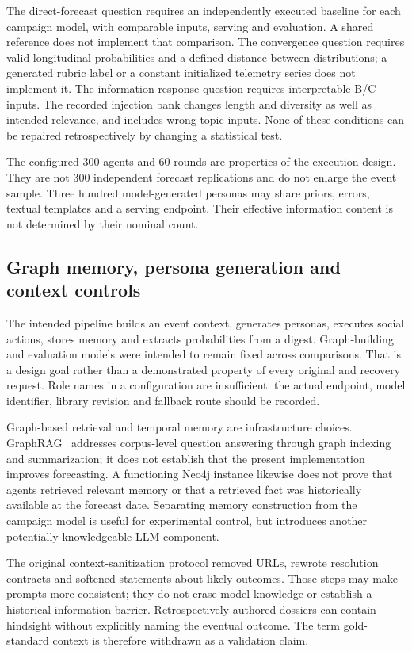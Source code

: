 The direct-forecast question requires an independently executed baseline for each campaign model, with comparable inputs, serving and evaluation. A shared reference does not implement that comparison. The convergence question requires valid longitudinal probabilities and a defined distance between distributions; a generated rubric label or a constant initialized telemetry series does not implement it. The information-response question requires interpretable B/C inputs. The recorded injection bank changes length and diversity as well as intended relevance, and includes wrong-topic inputs. None of these conditions can be repaired retrospectively by changing a statistical test.

The configured 300 agents and 60 rounds are properties of the execution design. They are not 300 independent forecast replications and do not enlarge the event sample. Three hundred model-generated personas may share priors, errors, textual templates and a serving endpoint. Their effective information content is not determined by their nominal count.

\subsection{Graph memory, persona generation and context controls}
\label{sec:confound}
The intended pipeline builds an event context, generates personas, executes social actions, stores memory and extracts probabilities from a digest. Graph-building and evaluation models were intended to remain fixed across comparisons. That is a design goal rather than a demonstrated property of every original and recovery request. Role names in a configuration are insufficient: the actual endpoint, model identifier, library revision and fallback route should be recorded.

Graph-based retrieval and temporal memory are infrastructure choices. GraphRAG~\cite{graphrag2024} addresses corpus-level question answering through graph indexing and summarization; it does not establish that the present implementation improves forecasting. A functioning Neo4j instance likewise does not prove that agents retrieved relevant memory or that a retrieved fact was historically available at the forecast date. Separating memory construction from the campaign model is useful for experimental control, but introduces another potentially knowledgeable LLM component.

The original context-sanitization protocol removed URLs, rewrote resolution contracts and softened statements about likely outcomes. Those steps may make prompts more consistent; they do not erase model knowledge or establish a historical information barrier. Retrospectively authored dossiers can contain hindsight without explicitly naming the eventual outcome. The term gold-standard context is therefore withdrawn as a validation claim.

